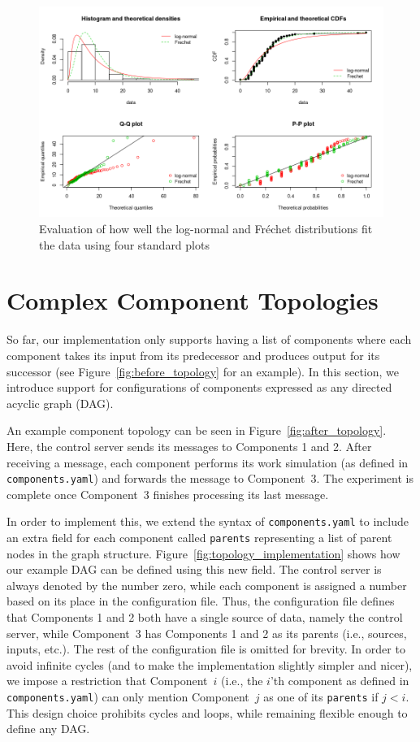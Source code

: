 \documentclass{article}
\begin{document}
\begin{figure}
  \centering
  \includegraphics[width=\textwidth]{../plots/cpu_time_distributions.png}
  \caption{Evaluation of how well the log-normal and Fr\'{e}chet distributions fit
    the data using four standard plots}
  \label{fig:frechet_fit}
\end{figure}

\section{Complex Component Topologies}

So far, our implementation only supports having a list of components where
each component takes its input from its predecessor and produces output for its
successor (see Figure~\ref{fig:before_topology} for an example). In this
section, we introduce support for configurations of components expressed as any
directed acyclic graph (DAG).

An example component topology can be seen in Figure~\ref{fig:after_topology}.
Here, the control server sends its messages to Components 1 and 2. After
receiving a message, each component
performs its work simulation (as defined in \texttt{components.yaml}) and
forwards the message to Component~3. The experiment is complete once Component~3
finishes processing its last message.

In order to implement this, we extend the syntax of \texttt{components.yaml} to
include an extra field for each component called \texttt{parents} representing a
list of parent nodes in the graph structure.
Figure~\ref{fig:topology_implementation} shows how our example DAG can be
defined using this new field. The control server is always denoted by the number
zero, while each component is assigned a number based on its place in the
configuration file. Thus, the configuration file defines that Components 1 and 2
both have a single source of data, namely the control server, while Component~3
has Components 1 and 2 as its parents (i.e., sources, inputs, etc.). The rest of
the configuration file is omitted for brevity. In order to avoid infinite cycles
(and to make the implementation slightly simpler and nicer), we impose a
restriction that Component~$i$ (i.e., the $i$'th component as defined in
\texttt{components.yaml}) can only mention Component~$j$ as one of its
\texttt{parents} if $j < i$. This design choice prohibits cycles and loops,
while remaining flexible enough to define any DAG.
\end{document}
